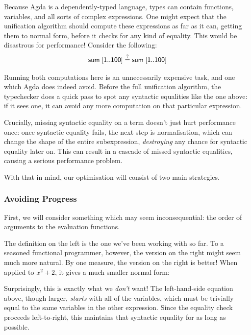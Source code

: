 \documentclass[acmsmall,review,anonymous]{acmart}\settopmatter{printfolios=true,printccs=false,printacmref=false}
\begin{document}
Because Agda is a dependently-typed language, types can contain functions,
variables, and all sorts of complex expressions. One might expect that the
unification algorithm should compute these expressions as far as it can, getting
them to normal form, before it checks for any kind of equality. This would be
disastrous for performance! Consider the following:
\[ \AgdaFunction{sum} \; [ \AgdaNumber{1} .. \AgdaNumber{100} ] \stackrel{?}{=}
  \AgdaFunction{sum} \; [ \AgdaNumber{1} .. \AgdaNumber{100} ] \]

Running both computations here is an unnecessarily expensive task, and one which
Agda does indeed avoid. Before the full unification algorithm, the typechecker
does a quick pass to spot any syntactic equalities like the one above: if it
sees one, it can avoid any more computation on that particular expression.

Crucially, missing syntactic equality on a term doesn't just hurt performance
once: once syntactic equality fails, the next step is normalisation, which can
change the shape of the entire subexpression, \emph{destroying} any chance for
syntactic equality later on. This can result in a cascade of missed syntactic
equalities, causing a serious performance problem.

With that in mind, our optimisation will consist of two main strategies.
\subsubsection{Avoiding Progress}
First, we will consider something which may seem inconsequential: the order of
arguments to the evaluation functions.
\begin{multicols}{2}
  \centering
\end{multicols}
The definition on the left is the one we've been working with so far. To a
seasoned functional programmer, however, the version on the right might seem
much more natural. By one measure, the version on the right is better! When
applied to \(x^2 + 2\), it gives a much smaller normal form:
\begin{multicols}{2}
  \centering
\end{multicols}
Surprisingly, this is exactly what we \emph{don't} want! The left-hand-side
equation above, though larger, \emph{starts} with all of the variables, which
must be trivially equal to the same variables in the other expression. Since the
equality check proceeds left-to-right, this maintains that syntactic equality
for as long as possible.
\end{document}

